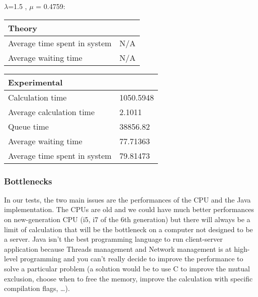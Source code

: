\begin{minipage}{\linewidth}
   $\lambda$=1.5 , $\mu$ = 0.4759:

    \bigskip
    \begin{minipage}{0.45\linewidth}
        \begin{tabular}{|l|l|}
            \hline
            Theory & \\
            \hline
            Average time spent in system & N/A \\
            Average waiting time & N/A \\
            \hline
        \end{tabular}
    \end{minipage}
    \begin{minipage}{0.45\linewidth}
        \begin{tabular}{|l|l|}
            \hline
            Experimental & \\
            \hline
            Calculation time & 1050.5948 \\
            Average calculation time & 2.1011 \\
            Queue time & 38856.82 \\
            Average waiting time & 77.71363 \\
            Average time spent in system & 79.81473 \\
            \hline
        \end{tabular}
    \end{minipage}
    \bigskip
\end{minipage}


\subsubsection{Bottlenecks}
\label{subs:Bottlenecks}

In our tests, the two main issues are the performances of the CPU and the Java
implementation. The CPUs are old and we could have much better performances on
new-generation CPU (i5, i7 of the 6th generation) but there will always be a
limit of calculation that will be the bottleneck on a computer not designed to be
a server. Java isn't the best programming language to run client-server application
because Threads management and Network management is at high-level programming
and you can't really decide to improve the performance to solve a particular
problem (a solution would be to use C to improve the mutual exclusion, choose when to
free the memory, improve the calculation with specific compilation flags,
\ldots). \newline
